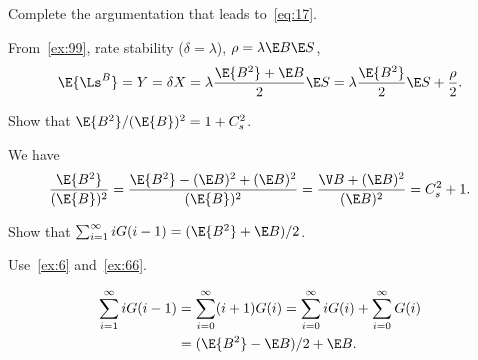 \begin{exercise}\label{ex:100}
Complete the argumentation that leads to~\cref{eq:17}.
\begin{solution}
  From~\cref{ex:99}, rate stability ($\delta = \lambda$), $\rho=\lambda \E B \E S$,
  \begin{equation*}
    \E{\Ls^B} = Y = \delta X = \lambda \frac{\E{B^2}+\E B}2 \E S =  \lambda \frac{\E{B^2}}{2} \E S + \frac \rho 2.
  \end{equation*}
\end{solution}
\end{exercise}


\begin{exercise}\label{q:batch}
Show that ${\E{B^2}}/{(\E{B})^2} = 1+C_s^2$.
\begin{solution}
We have
\begin{align*}
\frac{\E{B^2}}{(\E{B})^2}
  =\frac{\E{B^2}-(\E B)^2 + (\E B)^2}{(\E{B})^2}
= \frac{\V B + (\E B)^2}{(\E B)^2}= C_s^2+1.
\end{align*}
\end{solution}
\end{exercise}



\begin{exercise}\label{ex:ER}
 Show that $\sum_{i=1}^\infty i G(i-1)= ({\E{B^2} + \E B})/{2}$.
\begin{hint}
 Use~\cref{ex:6} and~\cref{ex:66}.
\end{hint}
\begin{solution}
\begin{equation*}
 \begin{split}
 \sum_{i=1}^\infty i G(i-1)
&=\sum_{i=0}^\infty (i+1) G(i)
=\sum_{i=0}^\infty i G(i) +
\sum_{i=0}^\infty G(i)\\
&= (\E{B^2} - \E B)/2 + \E B.
 \end{split}
\end{equation*}
\end{solution}
\end{exercise}




